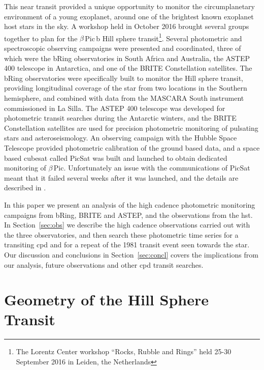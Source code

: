 \documentclass[longauth]{aa} %
\newcommand{\bpb}{$\beta$\,Pic\,b}
\newcommand{\bp}{$\beta$\,Pic}
\begin{document}
This near transit provided a unique opportunity to monitor the circumplanetary environment of a young exoplanet, around one of the brightest known exoplanet host stars in the sky.
%
A workshop held in October 2016 brought several groups together to plan for the \bpb{} Hill sphere transit\footnote{The Lorentz Center workshop ``Rocks, Rubble and Rings'' held 25-30 September 2016 in Leiden, the Netherlands}.
%
Several photometric and spectroscopic observing campaigns were presented and coordinated, three of which were the bRing observatories in South Africa and Australia, the ASTEP 400 telescope in Antarctica, and one of the BRITE Constellation satellites.
%
The bRing observatories were specifically built to monitor the Hill sphere transit, providing longitudinal coverage of the star from two locations in the Southern hemisphere, and combined with data from the MASCARA South instrument commissioned in La Silla.
%
The ASTEP 400 telescope was developed for photometric transit searches during the Antarctic winters, and the BRITE Constellation satellites are used for precision photometric monitoring of pulsating stars and asteroseismology.
%
An observing campaign with the Hubble Space Telescope provided photometric calibration of the ground based data, and a space based cubesat called PicSat \citep{Nowak18} was built and launched to obtain dedicated monitoring of \bp. 
%
Unfortunately an issue with the communications of PicSat meant that it failed several weeks after it was launched, and the details are described in \citet{Nowak18}.

In this paper we present an analysis of the high cadence photometric monitoring campaigns from bRing, BRITE and ASTEP, and the observations from the \ac{hst}.
%
In Section~\ref{sec:obs} we describe the high cadence observations carried out with the three observatories, and then search these photometric time series for a transiting \ac{cpd} and for a repeat of the 1981 transit event seen towards the star.
%
Our discussion and conclusions in Section~\ref{sec:concl} covers the implications from our analysis, future observations and other \ac{cpd} transit searches.




\section{Geometry of the Hill Sphere Transit}\label{sec:hs}
\end{document}
